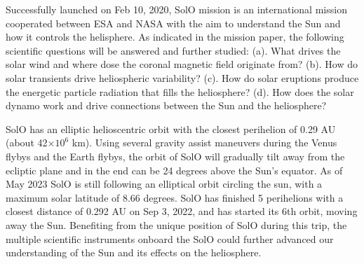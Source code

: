 Successfully launched on Feb 10, 2020, \ac{SolO} mission \citep{Mueller-2020-SolO} is an international mission cooperated between \ac{ESA} and \ac{NASA} with the aim to understand the Sun and how it controls the helisphere. As indicated in the mission paper, the following scientific questions will be answered and further studied: (a). What drives the solar wind and where dose the coronal magnetic field originate from? (b). How do solar transients drive heliospheric variability? (c). How do solar eruptions produce the energetic particle radiation that fills the heliosphere? (d). How does the solar dynamo work and drive connections between the Sun and the heliosphere?


\ac{SolO} has an elliptic helioscentric orbit with the closest perihelion of 0.29 AU (about 42$\times10^6$ km). Using several gravity assist maneuvers during the Venus flybys and the Earth flybys, the orbit of \ac{SolO} will gradually tilt away from the ecliptic plane and in the end can be 24 degrees above the Sun's equator. As of May 2023 \ac{SolO} is still following an elliptical orbit circling the sun, with a maximum solar latitude of 8.66 degrees. \ac{SolO} has finished 5 perihelions with a closest distance of 0.292 AU on Sep 3, 2022, and has started its 6th orbit, moving away the Sun. Benefiting from the unique position of \ac{SolO} during this trip, the multiple scientific instruments onboard the \ac{SolO} could further advanced our understanding of the Sun and its effects on the heliosphere.


